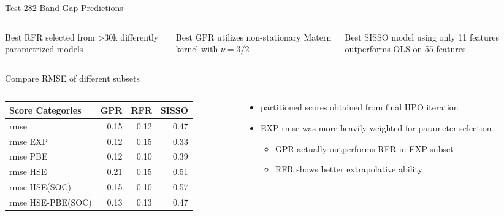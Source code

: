\documentclass[10pt, aspectratio=169, presentation]{beamer}
\begin{document}
\begin{frame}[label={sec:orga987518}]{Test 282 Band Gap Predictions}
 
\begin{center}

\end{center}

\begin{columns}
\begin{column}{0.3\columnwidth}
Best RFR selected from >30k differently parametrized models
\end{column}

\begin{column}{0.3\columnwidth}
Best GPR utilizes non-stationary Matern kernel with \(\nu=3\slash{}2\)
\end{column}

\begin{column}{0.3\columnwidth}
Best SISSO model using only 11 features outperforms OLS on 55 features
\end{column}
\end{columns}
\end{frame}

\begin{frame}[label={sec:orgfdc5018}]{Compare RMSE of different subsets}
\begin{columns}
\begin{column}{0.5\columnwidth}
\begin{center}
\begin{tabular}{lrrr}
Score Categories & GPR & RFR & SISSO\\[0pt]
\hline
rmse & 0.15 & 0.12 & 0.47\\[0pt]
rmse EXP & 0.12 & 0.15 & 0.33\\[0pt]
rmse PBE & 0.12 & 0.10 & 0.39\\[0pt]
rmse HSE & 0.21 & 0.15 & 0.51\\[0pt]
rmse HSE(SOC) & 0.15 & 0.10 & 0.57\\[0pt]
rmse HSE-PBE(SOC) & 0.13 & 0.13 & 0.47\\[0pt]
\end{tabular}
\end{center}
\end{column}

\begin{column}{0.5\columnwidth}
\begin{itemize}
\item partitioned scores obtained from final HPO iteration
\item EXP rmse was more heavily weighted for parameter selection
\begin{itemize}
\item GPR actually outperforms RFR in EXP subset
\item RFR shows better extrapolative ability
\end{itemize}
\end{itemize}
\end{column}
\end{columns}
\end{frame}
\end{document}

